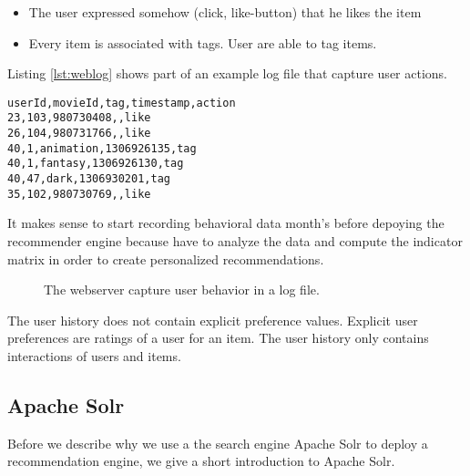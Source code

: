 \begin{itemize}
\item The user expressed somehow (click, like-button) that he likes the item
\item Every item is associated with tags. User are able to tag items.
\end{itemize}

Listing \ref{lst:weblog} shows part of an example log file that capture user actions.

\lstset{
basicstyle=\ttfamily,
columns=fullflexible,
keepspaces=true,
captionpos=b
}
\begin{lstlisting}[caption={User actions are stored in a web log.},label={lst:weblog}]
userId,movieId,tag,timestamp,action
23,103,980730408,,like
26,104,980731766,,like
40,1,animation,1306926135,tag
40,1,fantasy,1306926130,tag
40,47,dark,1306930201,tag
35,102,980730769,,like
\end{lstlisting}

It makes sense to start recording behavioral data month's before depoying the recommender engine because have to analyze the data and compute the indicator matrix in order to create personalized recommendations.

\begin{figure}
\centering
{}
\caption{The webserver capture user behavior in a log file.}
\end{figure}

The user history does not contain explicit preference values. Explicit user preferences are ratings of a user for an item. The user history only contains interactions of users and items. 

\subsection{Apache Solr}
\label{sec:solr}

Before we describe why we use a the search engine Apache Solr to deploy a recommendation engine, we give a short introduction to Apache Solr.

